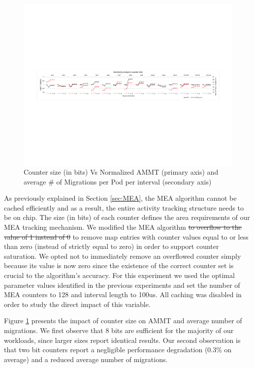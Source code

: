 \begin{figure}[t]
  \includegraphics[width=\textwidth]{figures/counter_size_normalized.pdf}
  \caption{Counter size (in bits) Vs Normalized AMMT (primary axis) and average \# of Migrations per Pod per interval (secondary axis)}
  \label{fig:counter_size}
\end{figure}

As previously explained in Section \ref{sec:MEA}, the MEA algorithm cannot be cached efficiently and as a result, the entire activity tracking structure needs to be on chip. The size (in bits) of each counter defines the area requirements of our MEA tracking mechanism. We modified the MEA algorithm \sout{to overflow to the value of 1 instead of 0} to remove map entries with counter values equal to or less than zero (instead of strictly equal to zero) in order to support counter saturation. We opted not to immediately remove an overflowed counter simply because its value is now zero since the existence of the correct counter set is crucial to the algorithm's accuracy. For this experiment we used the optimal parameter values identified in the previous experiments and set the number of MEA counters to 128 and interval length to 100us. All caching was disabled in order to study the direct impact of this variable.

Figure \ref{fig:counter_size} presents the impact of counter size on AMMT and average number of migrations. We first observe that 8 bits are sufficient for the majority of our workloads, since larger sizes report identical results. Our second observation is that two bit counters report a negligible performance degradation (0.3\% on average) and a reduced average number of migrations.

